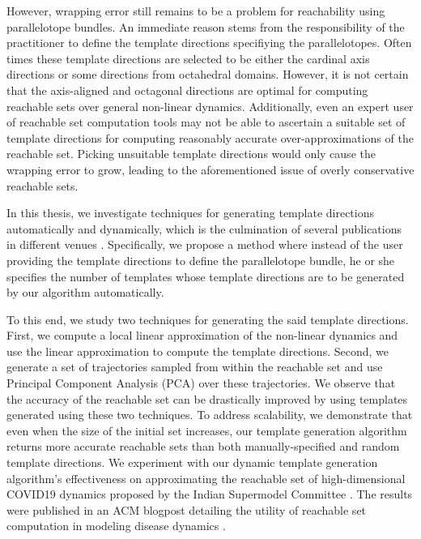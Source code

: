 However, wrapping error still remains to be a problem for reachability using parallelotope bundles.
%
An immediate reason stems from the responsibility of the practitioner to define the template directions specifiying the parallelotopes.
%
Often times these template directions are selected to be either the cardinal axis directions or some directions from octahedral domains.
%
However, it is not certain that the axis-aligned and octagonal directions are optimal for computing reachable sets over general non-linear dynamics.
%
Additionally, even an expert user of reachable set computation tools may not be able to ascertain a suitable set of template directions for computing reasonably accurate over-approximations of the reachable set.
%
Picking unsuitable template directions would only cause the wrapping error to grow, leading to the aforementioned issue of overly conservative reachable sets.

In this thesis, we investigate techniques for generating template directions automatically and dynamically, which is the culmination of several publications in different venues \cite{kim2020kaa,kim2021automatic,geretti2021arch}.
%
Specifically, we propose a method where instead of the user providing the template directions to define the parallelotope bundle, he or she specifies the number of templates whose template directions are to be generated by our algorithm automatically.

To this end, we study two techniques for generating the said template directions.
%
First, we compute a local linear approximation of the non-linear dynamics and use the linear approximation to compute the template directions.
%
Second, we generate a set of trajectories sampled from within the reachable set and use Principal Component Analysis (PCA) over these trajectories.
%
We observe that the accuracy of the reachable set can be drastically improved by using templates generated using these two techniques.
%
To address scalability, we demonstrate that even when the size of the initial set increases, our template generation algorithm returns more accurate reachable sets than both manually-specified and random template directions.
%
We experiment with our dynamic template generation algorithm's effectiveness on approximating the reachable set of high-dimensional COVID19 dynamics proposed by the Indian Supermodel Committee \cite{indiansuper2020supermodel}. The results were published in an ACM blogpost detailing the utility of reachable set computation in modeling disease dynamics \cite{bak2021covid}.

